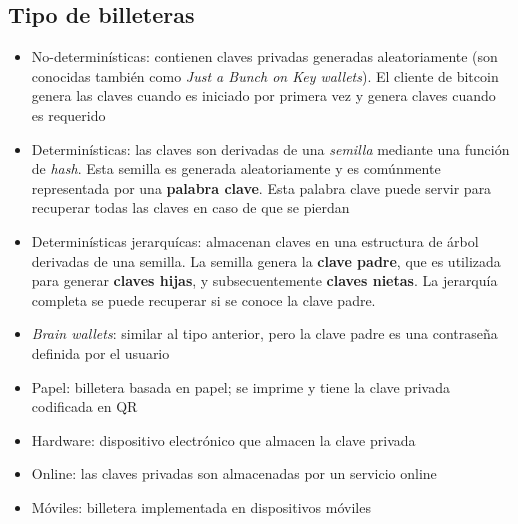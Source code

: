 \subsection{Tipo de billeteras}

\begin{itemize}
    \item No-determinísticas: contienen claves privadas generadas aleatoriamente (son conocidas también como \emph{Just a Bunch on Key wallets}). El cliente de bitcoin genera las claves cuando es iniciado por primera vez y genera claves cuando es requerido
    \item Determinísticas: las claves son derivadas de una \emph{semilla} mediante una función de \emph{hash}. Esta semilla es generada aleatoriamente y es comúnmente representada por una \textbf{palabra clave}. Esta palabra clave puede servir para recuperar todas las claves en caso de que se pierdan
    \item Determinísticas jerarquícas: almacenan claves en una estructura de árbol derivadas de una semilla. La semilla genera la \textbf{clave padre}, que es utilizada para generar \textbf{claves hijas}, y subsecuentemente \textbf{claves nietas}. La jerarquía completa se puede recuperar si se conoce la clave padre.
    \item \emph{Brain wallets}: similar al tipo anterior, pero la clave padre es una contraseña definida por el usuario
    \item Papel: billetera basada en papel; se imprime y tiene la clave privada codificada en QR
    \item Hardware: dispositivo electrónico que almacen la clave privada
    \item Online: las claves privadas son almacenadas por un servicio online
    \item Móviles: billetera implementada en dispositivos móviles \autocite{MasteringBlockchainTypeOfWallets}
\end{itemize}



\clearpage
\printbibliography


